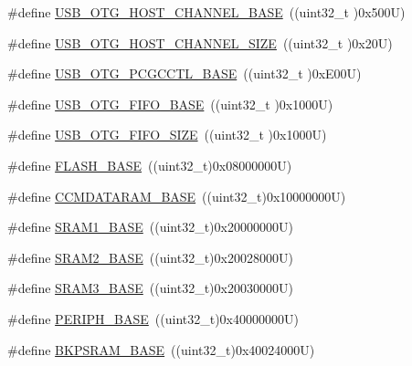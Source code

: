 \begin{DoxyCompactItemize}
\item 
\#define \hyperlink{group___peripheral__memory__map_ga942c8c5241b80fbcf638fea0fa18bebd}{U\+S\+B\+\_\+\+O\+T\+G\+\_\+\+H\+O\+S\+T\+\_\+\+C\+H\+A\+N\+N\+E\+L\+\_\+\+B\+A\+SE}~((uint32\+\_\+t )0x500\+U)
\item 
\#define \hyperlink{group___peripheral__memory__map_ga266cb1dbb50faf447f9c15d2ee93a522}{U\+S\+B\+\_\+\+O\+T\+G\+\_\+\+H\+O\+S\+T\+\_\+\+C\+H\+A\+N\+N\+E\+L\+\_\+\+S\+I\+ZE}~((uint32\+\_\+t )0x20\+U)
\item 
\#define \hyperlink{group___peripheral__memory__map_gaa9766975aca084c257730879568bc7cf}{U\+S\+B\+\_\+\+O\+T\+G\+\_\+\+P\+C\+G\+C\+C\+T\+L\+\_\+\+B\+A\+SE}~((uint32\+\_\+t )0x\+E00\+U)
\item 
\#define \hyperlink{group___peripheral__memory__map_gace340350802904868673f0e839c4fa04}{U\+S\+B\+\_\+\+O\+T\+G\+\_\+\+F\+I\+F\+O\+\_\+\+B\+A\+SE}~((uint32\+\_\+t )0x1000\+U)
\item 
\#define \hyperlink{group___peripheral__memory__map_ga8781c4b2406c740d9fe540737a6a0188}{U\+S\+B\+\_\+\+O\+T\+G\+\_\+\+F\+I\+F\+O\+\_\+\+S\+I\+ZE}~((uint32\+\_\+t )0x1000\+U)
\item 
\#define \hyperlink{group___peripheral__memory__map_ga23a9099a5f8fc9c6e253c0eecb2be8db}{F\+L\+A\+S\+H\+\_\+\+B\+A\+SE}~((uint32\+\_\+t)0x08000000\+U)
\item 
\#define \hyperlink{group___peripheral__memory__map_gabea1f1810ebeac402164b42ab54bcdf9}{C\+C\+M\+D\+A\+T\+A\+R\+A\+M\+\_\+\+B\+A\+SE}~((uint32\+\_\+t)0x10000000\+U)
\item 
\#define \hyperlink{group___peripheral__memory__map_ga7d0fbfb8894012dbbb96754b95e562cd}{S\+R\+A\+M1\+\_\+\+B\+A\+SE}~((uint32\+\_\+t)0x20000000\+U)
\item 
\#define \hyperlink{group___peripheral__memory__map_gadbb42a3d0a8a90a79d2146e4014241b1}{S\+R\+A\+M2\+\_\+\+B\+A\+SE}~((uint32\+\_\+t)0x20028000\+U)
\item 
\#define \hyperlink{group___peripheral__memory__map_gadb41012a2428a526d7ee5ff0f61d2344}{S\+R\+A\+M3\+\_\+\+B\+A\+SE}~((uint32\+\_\+t)0x20030000\+U)
\item 
\#define \hyperlink{group___peripheral__memory__map_ga9171f49478fa86d932f89e78e73b88b0}{P\+E\+R\+I\+P\+H\+\_\+\+B\+A\+SE}~((uint32\+\_\+t)0x40000000\+U)
\item 
\#define \hyperlink{group___peripheral__memory__map_ga52e57051bdf8909222b36e5408a48f32}{B\+K\+P\+S\+R\+A\+M\+\_\+\+B\+A\+SE}~((uint32\+\_\+t)0x40024000\+U)
\item 

\end{DoxyCompactItemize}
